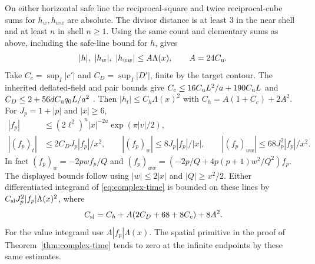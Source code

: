 On either horizontal safe line the reciprocal-square and twice
reciprocal-cube sums for \(h_w,h_{ww}\) are absolute. The divisor
distance is at least \(3\) in the near shell and at least \(n\)
in shell \(n\ge1\). Using the same count and elementary sums
as above, including the safe-line bound for \(h\), gives
\[
 |h|,\ |h_w|,\ |h_{ww}|\le A\Lambda(x),\qquad A=24C_{\mathrm u}.
\]
Take \(C_c=\sup_I|c'|\) and \(C_D=\sup_I|D'|\), finite by the
target contour. The inherited deflated-field and pair bounds
give \(C_c\le16 C_{\mathrm u} L^2/a+190 C_{\mathrm u} L\) and
\(C_D\le2+56d C_{\mathrm u} q_0 L/a^2\) \cite{BakerGT41,BakerCM03}.
Then \(|h_t|\le C_h\Lambda(x)^2\) with
\(C_h=A(1+C_c)+2A^2\). For \(J_p=1+|p|\) and \(|x|\ge6\),
\[
 \begin{aligned}
 |f_p|&\le (2\ell^2)^u|x|^{-2u}\exp(\pi|v|/2),\\
 |(f_p)_t|&\le 2C_D J_p|f_p|/x^2,\qquad
 |(f_p)_w|\le 8J_p|f_p|/|x|,\qquad
 |(f_p)_{ww}|\le 68J_p^2|f_p|/x^2.
 \end{aligned}
\]
In fact \((f_p)_w=-2pw f_p/Q\) and
\((f_p)_{ww}=(-2p/Q+4p(p+1)w^2/Q^2)f_p\).
The displayed bounds follow using \(|w|\le2|x|\) and
\(|Q|\ge x^2/2\). Either differentiated integrand of
\eqref{eq:complex-time} is bounded on these lines by
\(C_{\rm sl}J_p^2 |f_p|\Lambda(x)^2\), where
\[
 C_{\rm sl}=C_h+A(2C_D+68+8C_c)+8A^2 .
\]
For the value integrand use \(A|f_p|\Lambda(x)\).
The spatial primitive in the proof of
Theorem~\ref{thm:complex-time} tends to zero at the infinite
endpoints by these same estimates.

